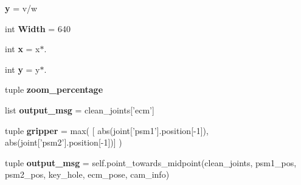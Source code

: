 \begin{DoxyCompactItemize}
\item 
\hypertarget{classautocamera__algorithm_1_1Autocamera_a55d96e7c6c384a5a04c149f1ed760c88}{{\bfseries y} = v/w}\label{classautocamera__algorithm_1_1Autocamera_a55d96e7c6c384a5a04c149f1ed760c88}

\item 
\hypertarget{classautocamera__algorithm_1_1Autocamera_a02c21de1e73f6a2459b5785c87d744ef}{int {\bfseries Width} = 640}\label{classautocamera__algorithm_1_1Autocamera_a02c21de1e73f6a2459b5785c87d744ef}

\item 
\hypertarget{classautocamera__algorithm_1_1Autocamera_a9695ec87d723607eb6c15142737f78d0}{int {\bfseries x} = x$\ast$.}\label{classautocamera__algorithm_1_1Autocamera_a9695ec87d723607eb6c15142737f78d0}

\item 
\hypertarget{classautocamera__algorithm_1_1Autocamera_a98c4ce7d9c50bb804a277d545c0c3700}{int {\bfseries y} = y$\ast$.}\label{classautocamera__algorithm_1_1Autocamera_a98c4ce7d9c50bb804a277d545c0c3700}

\item 
tuple {\bfseries zoom\-\_\-percentage}
\item 
\hypertarget{classautocamera__algorithm_1_1Autocamera_aa2132f7e89d44d9a5f02b770f378e4df}{list {\bfseries output\-\_\-msg} = clean\-\_\-joints\mbox{[}'ecm'\mbox{]}}\label{classautocamera__algorithm_1_1Autocamera_aa2132f7e89d44d9a5f02b770f378e4df}

\item 
\hypertarget{classautocamera__algorithm_1_1Autocamera_a276dfc60c57fa3b99bcdf1246c663f24}{tuple {\bfseries gripper} = max( \mbox{[} abs(joint\mbox{[}'psm1'\mbox{]}.position\mbox{[}-\/1\mbox{]}), abs(joint\mbox{[}'psm2'\mbox{]}.position\mbox{[}-\/1\mbox{]})\mbox{]} )}\label{classautocamera__algorithm_1_1Autocamera_a276dfc60c57fa3b99bcdf1246c663f24}

\item 
\hypertarget{classautocamera__algorithm_1_1Autocamera_aa2132f7e89d44d9a5f02b770f378e4df}{tuple {\bfseries output\-\_\-msg} = self.\-point\-\_\-towards\-\_\-midpoint(clean\-\_\-joints, psm1\-\_\-pos, psm2\-\_\-pos, key\-\_\-hole, ecm\-\_\-pose, cam\-\_\-info)}\label{classautocamera__algorithm_1_1Autocamera_aa2132f7e89d44d9a5f02b770f378e4df}

\end{DoxyCompactItemize}


